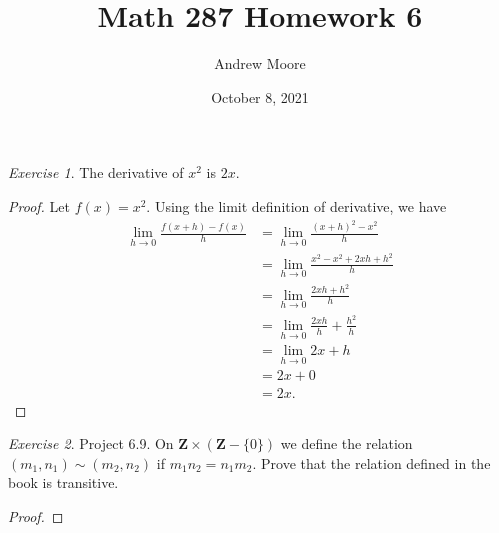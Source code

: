 \documentclass[12pt,oneside]{amsart}
\title{Math 287 Homework 6}
\author{Andrew Moore}
\date{October 8, 2021} %
\theoremstyle{remark}
\newtheorem{exer}{Exercise}
\newcommand{\bfZ}{\mathbf{Z}}
\begin{document}
\maketitle

%
%
%
%
\newpage
\begin{exer}
The derivative of $x^2$ is $2x$.
\end{exer}
\begin{proof}
Let $f(x) = x^2$.
Using the limit definition of derivative, we have
\begin{equation}
\begin{split}
  \lim_{h \to 0} \frac{f(x+h) - f(x)}{h} &= \lim_{h \to 0} \frac{(x + h)^2 - x^2}{h} \\
                                         &= \lim_{h \to 0} \frac{x^2 - x^2 + 2xh + h^2}{h} \\
                                         &= \lim_{h \to 0} \frac{2xh + h^2}{h} \\
                                         &= \lim_{h \to 0} \frac{2xh}{h} + \frac{h^2}{h} \\
                                         &= \lim_{h \to 0} 2x + h \\
                                         &= 2x + 0 \\
                                         &= 2x.
\end{split}
\end{equation}
\end{proof}

%
%
%
%
\newpage
\begin{exer}
Project 6.9. On $\bfZ \times (\bfZ - \{0\})$ we define the relation $(m_1, n_1) \sim (m_2, n_2)$ if $m_1n_2 = n_1m_2$. Prove that the relation defined in the book is transitive.
%
%
\end{exer}

\begin{proof}
\end{proof}
\end{document}
